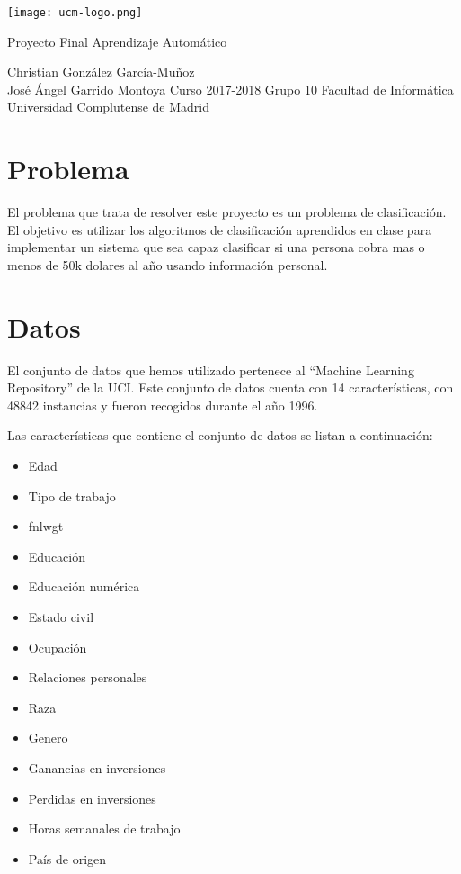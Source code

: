 \documentclass[11pt,spanish]{article}
\begin{document}
\begin{titlepage}
	\centering
    \texttt{[image: ucm-logo.png]}
    \vskip 1cm
    
    \centering
    {\huge Proyecto Final Aprendizaje Automático
    }
    \newline
    \newline
    \newline
    \newline
    
	\centering \large { Christian González García-Muñoz \\  José Ángel Garrido Montoya}
    \vskip 1cm
    \centering \Large {Curso 2017-2018}
    \vskip 1cm
    \centering \Large { Grupo 10 }
	\vskip 1cm
    \centering \large {Facultad de Informática \\ Universidad Complutense de Madrid}
    \vskip 0.5cm

\end{titlepage}
\newpage
\tableofcontents
\newpage
\listoffigures
\newpage
\section{Problema}
El problema que trata de resolver este proyecto es un problema de clasificación. El objetivo es utilizar los algoritmos de clasificación aprendidos en clase para implementar un sistema que sea capaz clasificar si una persona cobra mas o menos de 50k dolares al año usando información personal. 
\section{Datos}
El conjunto de datos que hemos utilizado \cite{dataset} pertenece al ``Machine Learning Repository'' de la UCI. Este conjunto de datos cuenta con 14 características, con 48842 instancias y fueron recogidos durante el año 1996.
\newline

Las características que contiene el conjunto de datos se listan a continuación: 

\begin{itemize}
    \item Edad 
	\item Tipo de trabajo
    \item fnlwgt
	\item Educación
    \item Educación numérica
    \item Estado civil
    \item Ocupación
    \item Relaciones personales
    \item Raza
    \item Genero
    \item Ganancias en inversiones
    \item Perdidas en inversiones
    \item Horas semanales de trabajo
    \item País de origen
    \newline
\end{itemize}
\end{document}
